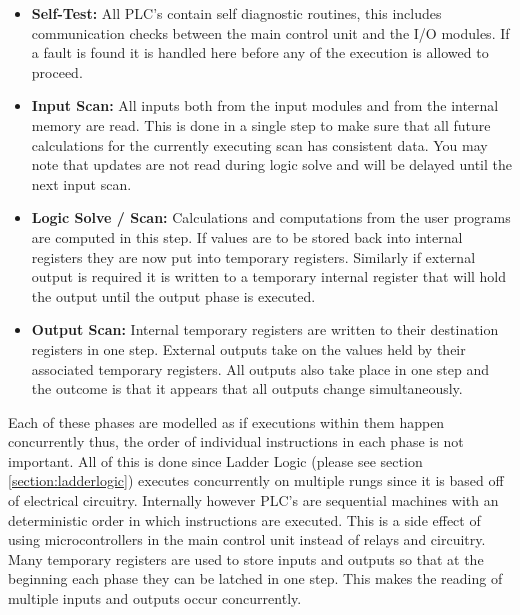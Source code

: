 \begin{itemize}
	\item\textbf{Self-Test:} All PLC's contain self diagnostic routines, this includes communication checks between the main control unit and the I/O modules. If a fault is found it is handled here before any of the execution is allowed to proceed.
	\item\textbf{Input Scan:} All inputs both from the input modules and from the internal memory are read. This is done in a single step to make sure that all future calculations for the currently executing scan has consistent data. You may note that updates are not read during logic solve and will be delayed until the next input scan.
	\item\textbf{Logic Solve / Scan:} Calculations and computations from the user programs are computed in this step. If values are to be stored back into internal registers they are now put into temporary registers. Similarly if external output is required it is written to a temporary internal register that will hold the output until the output phase is executed.
	\item\textbf{Output Scan:} Internal temporary registers are written to their destination registers in one step. External outputs take on the values held by their associated temporary registers. All outputs also take place in one step and the outcome is that it appears that all outputs change simultaneously.
\end{itemize}

Each of these phases are modelled as if executions within them happen concurrently thus, the order of individual instructions in each phase is not important. All of this is done since Ladder Logic (please see section \ref{section:ladderlogic}) executes concurrently on multiple rungs since it is based off of electrical circuitry. Internally however PLC's are sequential machines with an deterministic order in which instructions are executed. This is a side effect of using microcontrollers in the main control unit instead of relays and circuitry. Many temporary registers are used to store inputs and outputs so that at the beginning each phase they can be latched in one step. This makes the reading of multiple inputs and outputs occur concurrently.

